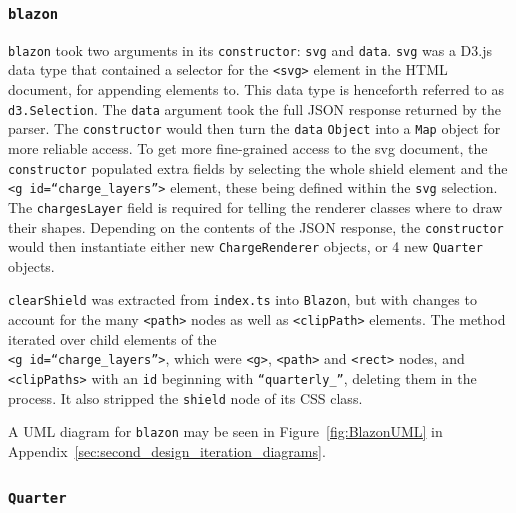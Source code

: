 \documentclass[nobib, a4paper, twoside, justified]{tufte-book}
\makeatletter
\newcommand{\svg}{\gls{svg}\@\xspace}
\newcommand{\ublazon}{\Gls{blazon}\@\xspace}
\makeatother
\begin{document}
\subsubsection{\texttt{\ublazon}}%
\label{ssub:blazon}

\texttt{\ublazon} took two arguments in its \texttt{constructor}: \texttt{svg} and \texttt{data}.
\texttt{svg} was a D3.js~\autocite{d3js} data type that contained a selector for the \texttt{<svg>}
element in the HTML document, for appending elements to. This data type is henceforth referred to
as \texttt{d3.Selection}. The \texttt{data} argument took the full JSON response returned by the
parser. The \texttt{constructor} would then turn the \texttt{data} \texttt{Object} into a
\texttt{Map} object for more reliable access. To get more fine-grained access to the \svg document,
the \texttt{constructor} populated extra fields by selecting the whole shield element and the
\texttt{<g id=``charge\_layers''>} element, these being defined within the \texttt{svg} selection.
The \texttt{chargesLayer} field is required for telling the renderer classes where to draw their
shapes.  Depending on the contents of the JSON response, the \texttt{constructor} would then
instantiate either new \texttt{ChargeRenderer} objects, or 4 new \texttt{Quarter} objects.

\texttt{clearShield} was extracted from \texttt{index.ts} into \texttt{Blazon}, but with changes to
account for the many \texttt{<path>} nodes as well as \texttt{<clipPath>} elements. The method
iterated over child elements of the \\ \texttt{<g id=``charge\_layers''>}, which were \texttt{<g>},
\texttt{<path>} and \texttt{<rect>} nodes, and \texttt{<clipPaths>} with an \texttt{id} beginning
with \texttt{``quarterly\_''}, deleting them in the process. It also stripped the \texttt{shield}
node of its CSS class.

A UML diagram for \texttt{\ublazon} may be seen in Figure~\ref{fig:BlazonUML} in
Appendix~\ref{sec:second_design_iteration_diagrams}.

\subsubsection{\texttt{Quarter}}%
\label{ssub:quarter}
\end{document}
